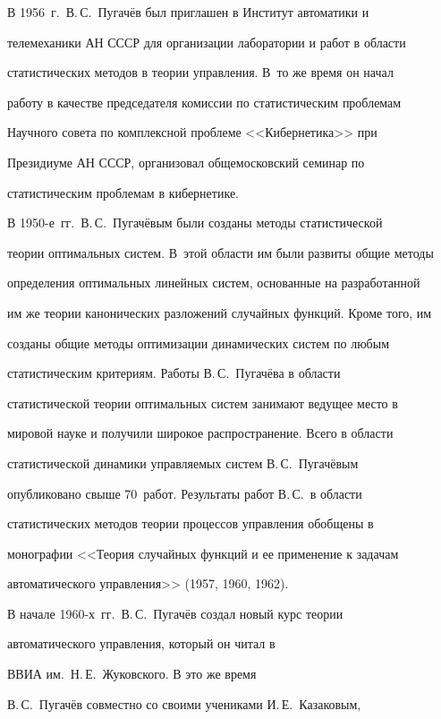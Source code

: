      В 1956~г.\ В.\,С.~Пугачёв был приглашен в Институт автоматики и 


телемеханики АН СССР для организации лаборатории и работ в области 


статистических методов в теории управления. В~то же время он начал 


работу в качестве председателя комиссии по статистическим проблемам 


Научного совета по комплексной проблеме <<Кибернетика>> при 


Президиуме АН СССР, организовал общемосковский семинар по 


статистическим проблемам в кибернетике.


     


     В 1950-е~гг.\ В.\,С.~Пугачёвым были созданы методы статистической 


теории оптимальных систем. В~этой области им были развиты общие методы 


определения оптимальных линейных систем, основанные на разработанной 


им же теории канонических разложений случайных функций. Кроме того, им 


созданы общие методы оптимизации динамических систем по любым 


статистическим критериям. Работы В.\,С.~Пугачёва в области 


статистической теории оптимальных систем занимают ведущее место в 


мировой науке и получили широкое распространение. Всего в области 


статистической динамики управляемых систем В.\,С.~Пугачёвым 


опубликовано свыше 70~работ. Результаты работ В.\,С.\ в области 


статистических методов теории процессов управления обобщены в 


монографии <<Теория случайных функций и ее применение к задачам 


автоматического управления>> (1957, 1960, 1962).


     


     В начале 1960-х~гг.\ В.\,С.~Пугачёв создал новый курс теории 


автоматического управления, который он читал в 


      ВВИА им.\ Н.\,Е.~Жуковского. В это же время 


В.\,С.~Пугачёв совместно со своими учениками И.\,Е.~Казаковым, 


